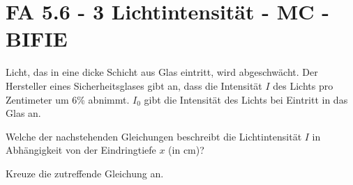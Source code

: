 \section{FA 5.6 - 3 Lichtintensität  - MC - BIFIE}

\begin{beispiel}[FA 5.6]{1} %
Licht, das in eine dicke Schicht aus Glas eintritt, wird abgeschwächt. Der Hersteller eines Sicherheitsglases
gibt an, dass die Intensität $I$ des Lichts pro Zentimeter um 6\% abnimmt. $I_0$ gibt die Intensität des Lichts bei Eintritt in das Glas an. 

Welche der nachstehenden Gleichungen beschreibt die Lichtintensität $I$ in Abhängigkeit von der Eindringtiefe $x$ (in cm)? 
\leer

Kreuze die zutreffende Gleichung an.


\end{beispiel}